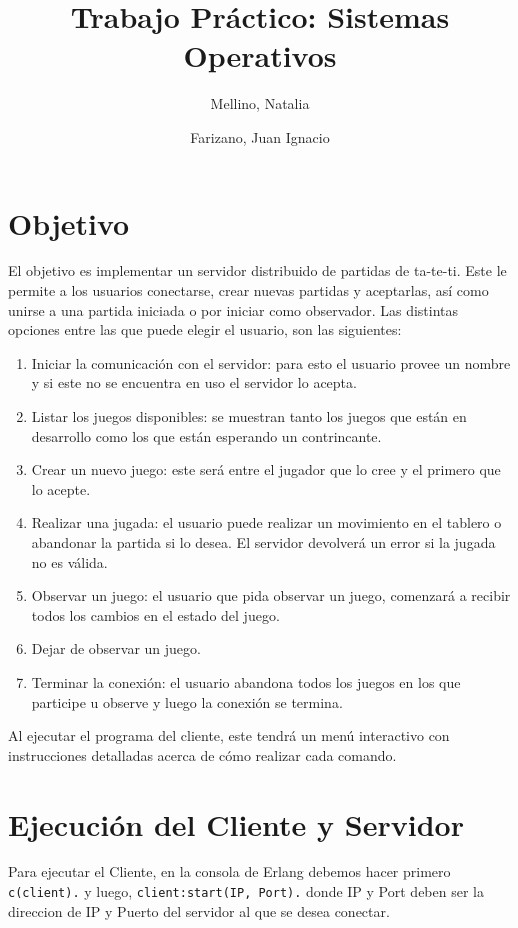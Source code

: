\documentclass[11pt]{article}
\title{Trabajo Práctico: Sistemas Operativos}
\author{Mellino, Natalia \and Farizano, Juan Ignacio}
\date{}
\begin{document}
\maketitle

\section*{Objetivo}
El objetivo es implementar un servidor distribuido de partidas de ta-te-ti. Este le permite a los 
usuarios conectarse, crear nuevas partidas y aceptarlas, así como unirse a una
partida iniciada o por iniciar como observador. Las distintas opciones entre las que
puede elegir el usuario, son las siguientes:

\begin{enumerate}
    \item Iniciar la comunicación con el servidor: para esto el usuario provee un
          nombre y si este no se encuentra en uso el servidor lo acepta.
    \item Listar los juegos disponibles: se muestran tanto los juegos que están en
          desarrollo como los que están esperando un contrincante.
    \item Crear un nuevo juego: este será entre el jugador que lo cree y el primero
          que lo acepte.
    \item Realizar una jugada: el usuario puede realizar un movimiento en el 
          tablero o abandonar la partida si lo desea. El servidor devolverá un
          error si la jugada no es válida.
    \item Observar un juego: el usuario que pida observar un juego, comenzará a 
          recibir todos los cambios en el estado del juego.
    \item Dejar de observar un juego.
    \item Terminar la conexión: el usuario abandona todos los juegos en los que 
          participe u observe y luego la conexión se termina.
\end{enumerate}

Al ejecutar el programa del cliente, este tendrá un menú interactivo con instrucciones
detalladas acerca de cómo realizar cada comando.

\section*{Ejecución del Cliente y Servidor}

Para ejecutar el Cliente, en la consola de Erlang debemos hacer primero \texttt{c(client).} y
luego, \texttt{client:start(IP, Port).} donde IP y Port deben ser la direccion de IP y
Puerto del servidor al que se desea conectar. \\
\end{document}
